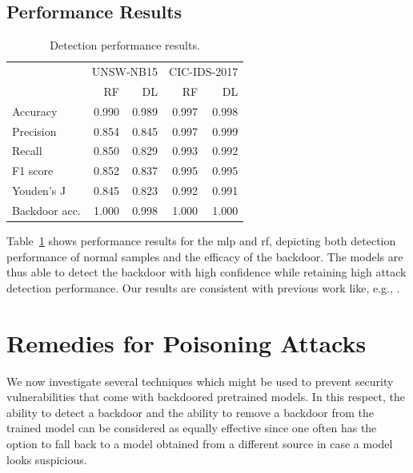 \documentclass[9pt,sigconf,letterpaper,dvipsnames\ifx\removeHeaders\tempYes ,nonacm\fi]{acmart}
\newcommand{\unsw}{UNSW-NB15}
\newcommand{\cic}{CIC-IDS-2017}
\begin{document}
\subsection{Performance Results}
\begin{table}[t]
\caption{Detection performance results.} \label{tab:performance_results}
\begin{tabular}{l r r r r} \toprule
& \multicolumn{2}{r}{\unsw{}} & \multicolumn{2}{r}{\cic{}} \\
& RF & DL & RF & DL \\ \midrule
Accuracy	& 0.990 & 0.989 & 0.997 & 0.998\\
Precision	& 0.854 & 0.845 & 0.997 & 0.999\\
Recall	& 0.850 & 0.829 & 0.993 & 0.992\\
F1 score	& 0.852 & 0.837 & 0.995 & 0.995\\
Youden's J	& 0.845 & 0.823 & 0.992 & 0.991\\
Backdoor acc.	& 1.000 & 0.998 & 1.000 & 1.000\\
\bottomrule
\end{tabular}
\end{table}
Table~\ref{tab:performance_results} shows performance results for
the \gls{mlp} and \gls{rf}, depicting both detection performance of normal samples
and the efficacy of the backdoor. The models are thus able to detect the backdoor with high confidence while retaining high attack detection performance.
Our results are consistent with previous work like, e.g., \cite{meghdouri_analysis_2018}.

\section{Remedies for Poisoning Attacks}
We now investigate several techniques which might be used to prevent security vulnerabilities that
come with backdoored pretrained  models. In this respect, the ability to detect a backdoor and the ability to remove a backdoor from the trained model can be considered as equally effective since one often has the option to fall back to a model obtained from a different source in case a model looks suspicious.
\end{document}
